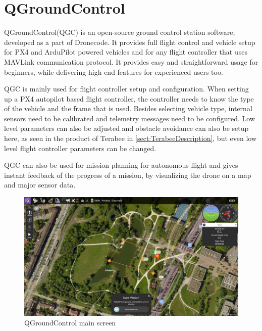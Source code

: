 \section{QGroundControl}
QGroundControl(QGC) is an open-source ground control station software, developed as a part of Dronecode. It provides
full flight control and vehicle setup for PX4 and ArduPilot powered vehicles and for any flight controller that
uses MAVLink communication protocol. It provides easy and straightforward usage for beginners, while delivering
high end features for experienced users too.

QGC is mainly used for flight controller setup and configuration. When setting up a PX4 autopilot based flight 
controller, the controller needs to know the type of the vehicle and the frame that is used. Besides selecting 
vehicle type, internal sensors need to be calibrated and telemetry messages need to be configured. Low level 
parameters can also be adjusted and obstacle avoidance can also be setup here, as seen in the product of Terabee
in \ref{sect:TerabeeDescription}, but even low level flight controller parameters can be changed.

QGC can also be used for mission planning for autonomous flight and gives instant feedback of the progress of a 
mission, by visualizing the drone on a map and major sensor data.

\begin{figure}[h]
    \centering
    \includegraphics[width=130mm, keepaspectratio]{figures/qgc_start_screen.jpg}
    \caption{QGroundControl main screen\cite{QGCWebpage}}
    \label{fig:qgc_main_screen}
\end{figure}